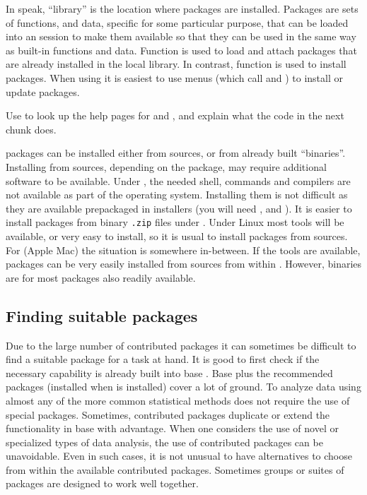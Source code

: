 \documentclass[krantz2]{krantz}\usepackage{knitr}
\begin{document}
In \Rlang speak, ``library'' is the location where packages are installed. Packages are sets of functions, and data, specific for some particular purpose, that can be loaded into an \Rlang session to make them available so that they can be used in the same way as built-in \Rlang functions and data. Function  is used to load and attach packages that are already installed in the local \Rlang library. In contrast, function  is used to install packages. When using \RStudio it is easiest to use \RStudio menus (which call  and ) to install or update packages.

\begin{playground}
Use  to look up the help pages for  and , and explain what the code in the next chunk does.
\end{playground}

\Rpgrm packages can be installed either from sources, or from already built ``binaries''. Installing from sources, depending on the package, may require additional software to be available. Under , the needed shell, commands and compilers are not available as part of the operating system. Installing them is not difficult as they are available prepackaged in installers (you will need , and ). It is easier to install packages from binary \texttt{.zip} files under . Under Linux most tools will be available, or very easy to install, so it is usual to install packages from sources. For  (Apple Mac) the situation is somewhere in-between. If the tools are available, packages can be very easily installed from sources from within \RStudio. However, binaries are for most packages also readily available.

\subsection{Finding suitable packages}

Due to the large number of contributed \Rlang packages it can sometimes be difficult to find a suitable package for a task at hand. It is good to first check if the necessary capability is already built into base \Rlang. Base \Rlang plus the recommended packages (installed when \Rlang is installed) cover a lot of ground. To analyze data using almost any of the more common statistical methods does not require the use of special packages. Sometimes, contributed packages duplicate or extend the functionality in base \Rlang with advantage. When one considers the use of novel or specialized types of data analysis, the use of contributed packages can be unavoidable. Even in such cases, it is not unusual to have alternatives to choose from within the available contributed packages. Sometimes groups or suites of packages are designed to work well together.
\end{document}
